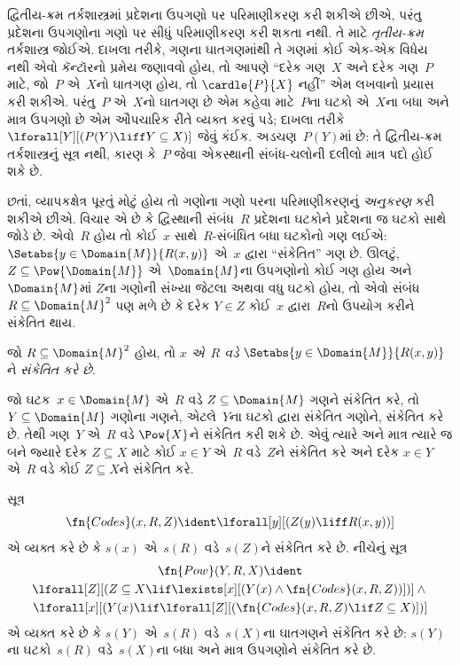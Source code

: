 \begin{explain}
દ્વિતીય-ક્રમ તર્કશાસ્ત્રમાં પ્રદેશના ઉપગણો પર પરિમાણીકરણ કરી
શકીએ છીએ, પરંતુ પ્રદેશના ઉપગણોના ગણો પર સીધું પરિમાણીકરણ કરી
શકતા નથી. તે માટે \emph{તૃતીય-ક્રમ} તર્કશાસ્ત્ર જોઈએ. દાખલા તરીકે,
ગણના ઘાતગણમાંથી તે ગણમાં કોઈ એક-એક વિધેય નથી એવો
કૅન્ટૉરનો પ્રમેય જણાવવો હોય, તો આપણે ``દરેક ગણ~$X$ અને દરેક
ગણ~$P$ માટે, જો~$P$ એ~$X$નો ઘાતગણ હોય, તો
$\cardle{P}{X}$ નહીં'' એમ લખવાનો પ્રયાસ કરી શકીએ. પરંતુ~$P$
એ~$X$નો ઘાતગણ છે એમ કહેવા માટે~$P$ના ઘટકો એ~$X$ના
બધા અને માત્ર ઉપગણો છે એમ ઔપચારિક રીતે વ્યક્ત કરવું પડે; દાખલા
તરીકે $\lforall[Y][(P(Y) \liff Y \subseteq X)]$ જેવું કંઈક.
અડચણ~$P(Y)$માં છે: તે દ્વિતીય-ક્રમ તર્કશાસ્ત્રનું સૂત્ર
નથી, કારણ કે~$P$ જેવા એકસ્થાની સંબંધ-ચલોની દલીલો માત્ર પદો હોઈ
શકે છે.

છતાં, વ્યાપકક્ષેત્ર પૂરતું મોટું હોય તો ગણોના ગણો પરના પરિમાણીકરણનું
\emph{અનુકરણ} કરી શકીએ છીએ. વિચાર એ છે કે દ્વિસ્થાની સંબંધ~$R$
પ્રદેશના ઘટકોને પ્રદેશના જ ઘટકો સાથે જોડે છે.
એવો~$R$ હોય તો કોઈ~$x$ સાથે~$R$-સંબંધિત બધા ઘટકોનો ગણ લઈએ:
$\Setabs{y \in \Domain{M}}{R(x,y)}$ એ~$x$ દ્વારા
``સંકેતિત'' ગણ છે. ઊલટું, $Z \subseteq \Pow{\Domain{M}}$
એ~$\Domain{M}$ના ઉપગણોનો કોઈ ગણ હોય અને~$\Domain{M}$માં
$Z$ના ગણોની સંખ્યા જેટલા અથવા વધુ ઘટકો હોય, તો એવો
સંબંધ~$R \subseteq \Domain{M}^2$ પણ મળે છે કે દરેક $Y \in Z$
કોઈ~$x$ દ્વારા~$R$નો ઉપયોગ કરીને સંકેતિત થાય.
\end{explain}

\begin{defn}
જો $R \subseteq \Domain{M}^2$ હોય, તો \emph{$x$ એ~$R$ વડે}
$\Setabs{y \in \Domain{M}}{R(x, y)}$ને \emph{સંકેતિત કરે છે}.
\end{defn}

જો ઘટક~$x \in \Domain{M}$ એ~$R$ વડે
$Z \subseteq \Domain{M}$ ગણને સંકેતિત કરે, તો
$Y \subseteq \Domain{M}$ ગણોના ગણને, એટલે~$Y$ના ઘટકો
દ્વારા સંકેતિત ગણોને, સંકેતિત કરે છે. તેથી ગણ~$Y$ એ~$R$ વડે
$\Pow{X}$ને સંકેતિત કરી શકે છે. એવું ત્યારે અને માત્ર ત્યારે જ બને
જ્યારે દરેક $Z \subseteq X$ માટે કોઈ $x \in Y$ એ~$R$ વડે~$Z$ને
સંકેતિત કરે અને દરેક $x \in Y$ એ~$R$ વડે કોઈ $Z \subseteq X$ને
સંકેતિત કરે.

\begin{prop}
સૂત્ર
  \[
  \fn{Codes}(x, R, Z) \ident \lforall[y][(Z(y) \liff
    R(x, y))]
  \]
એ વ્યક્ત કરે છે કે $s(x)$ એ~$s(R)$ વડે~$s(Z)$ને સંકેતિત કરે છે.
નીચેનું સૂત્ર
\begin{multline*}
  \fn{Pow}(Y, R, X) \ident \\
  \lforall[Z][(Z \subseteq X \lif \lexists[x][(Y(x) \land
    \fn{Codes}(x, R, Z))])] \land {} \\ \lforall[x][(Y(x) \lif
  \lforall[Z][(\fn{Codes}(x, R, Z) \lif Z \subseteq X)])]
\end{multline*}
એ વ્યક્ત કરે છે કે $s(Y)$ એ~$s(R)$ વડે~$s(X)$ના ઘાતગણને
સંકેતિત કરે છે: $s(Y)$ના ઘટકો~$s(R)$ વડે~$s(X)$ના બધા અને માત્ર
ઉપગણોને સંકેતિત કરે છે.
\end{prop}

